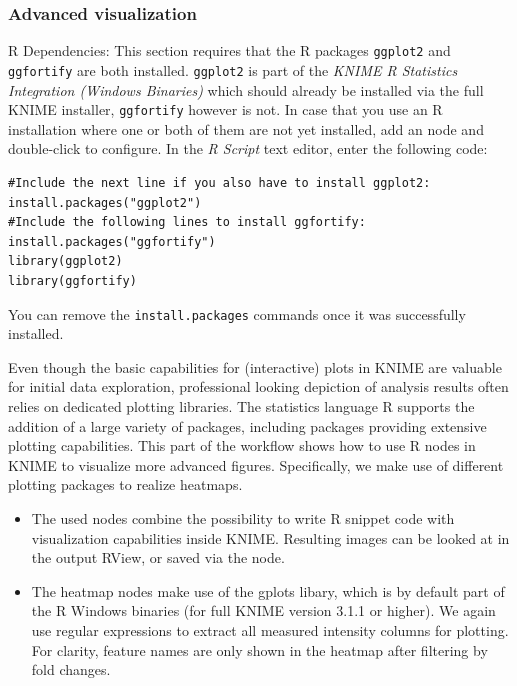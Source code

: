 \subsubsection{Advanced visualization}
\label{sec:metaboR}
R Dependencies: This section requires that the R packages \texttt{ggplot2} and \texttt{ggfortify} are both installed. \texttt{ggplot2} is part of the \textit{KNIME R Statistics Integration (Windows Binaries)} which should already be installed via the full KNIME installer, \texttt{ggfortify} however is not.
In case that you use an R installation where one or both of them are not yet installed, add an  node and double-click to configure. In the \textit{R Script} text editor, enter the following code:
\begin{lstlisting}
#Include the next line if you also have to install ggplot2:
install.packages("ggplot2")
#Include the following lines to install ggfortify:
install.packages("ggfortify")
library(ggplot2)
library(ggfortify)
\end{lstlisting}
You can remove the \texttt{install.packages} commands once it was successfully installed.

Even though the basic capabilities for (interactive) plots in KNIME are valuable for initial data exploration, professional looking depiction of analysis results often relies on dedicated plotting libraries. The statistics language R supports the addition of a large variety of packages, including packages providing extensive plotting capabilities. This part of the workflow shows how to use R nodes in KNIME to visualize more advanced figures. Specifically, we make use of different plotting packages to realize heatmaps.


\begin{itemize}
\item The used  nodes combine the possibility to write R snippet code with visualization capabilities inside KNIME. Resulting images can be looked at in the output RView, or saved via the  node.
\item The heatmap nodes make use of the gplots libary, which is by default part of the R Windows binaries (for full KNIME version 3.1.1 or higher). We again use regular expressions to extract all measured intensity columns for plotting. For clarity, feature names are only shown in the heatmap after filtering by fold changes.
\end{itemize}


